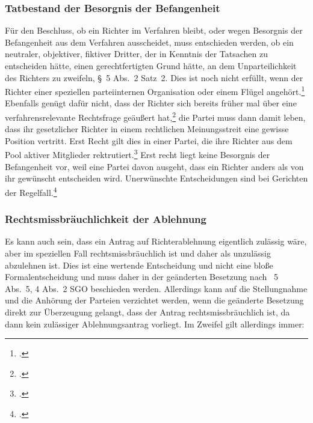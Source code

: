 \subsubsection{Tatbestand der Besorgnis der Befangenheit}
\label{Zusammensetzung:Spruchkoerper:Befangenheitsbesorgnis:Tatbestand}
Für den Beschluss, ob ein Richter im Verfahren bleibt, oder wegen Besorgnis der Befangenheit aus dem Verfahren ausscheidet, muss entschieden werden, ob ein neutraler, objektiver, fiktiver Dritter, der in Kenntnis der Tatsachen zu entscheiden hätte, einen gerechtfertigten Grund hätte, an dem Unparteilichkeit des Richters zu zweifeln, \S~5 Abs.~2 Satz~2.
Dies ist noch nicht erfüllt, wenn der Richter einer speziellen parteiinternen Organisation oder einem Flügel angehört.\footnote{\cite[S.~6]{BSG115HSBefangeheitIII}.}
Ebenfalls genügt dafür nicht, dass der Richter sich bereits früher mal über eine verfahrensrelevante Rechtsfrage geäußert hat,\footnote{\cite{BGHXIZR38801}.} die Partei muss dann damit leben, dass ihr gesetzlicher Richter in einem rechtlichen Meinungsstreit eine gewisse Position vertritt.
Erst Recht gilt dies in einer Partei, die ihre Richter aus dem Pool aktiver Mitglieder rektrutiert.\footnote{\cites[Lenski][\S~14 Rn~15]{lenski2011parteiengesetz}.}
Erst recht liegt keine Besorgnis der Befangenheit vor, weil eine Partei davon ausgeht, dass ein Richter anders als von ihr gewünscht entscheiden wird. Unerwünschte Entscheidungen sind bei Gerichten der Regelfall.\footnote{\cites[S.~2]{BSG201305062BefangenheitI}.}

\subsubsection{Rechtsmissbräuchlichkeit der Ablehnung}
\label{Zusammensetzung:Spruchkoerper:Befangenheitsbesorgnis:Rechtsmissbrauch}
Es kann auch sein, dass ein Antrag auf Richterablehnung eigentlich zulässig wäre, aber im speziellen Fall rechtsmissbräuchlich ist und daher als unzulässig abzulehnen ist.
Dies ist eine wertende Entscheidung und nicht eine bloße Formalentscheidung und muss daher in der geänderten Besetzung nach \SSS~5 Abs.~5, 4 Abs.~2 SGO beschieden werden.
Allerdings kann auf die Stellungnahme und die Anhörung der Parteien verzichtet werden, wenn die geänderte Besetzung direkt zur Überzeugung gelangt, dass der Antrag rechtsmissbräuchlich ist, da dann kein zulässiger Ablehnungsantrag vorliegt.
Im Zweifel gilt allerdings immer: 

